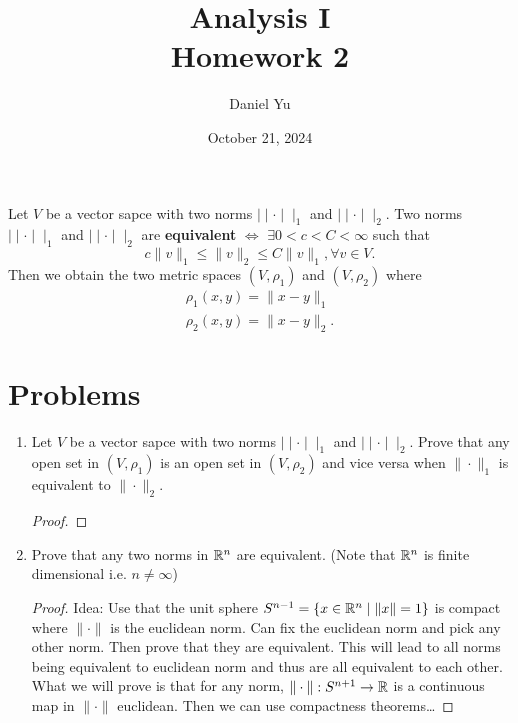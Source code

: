 \documentclass[a4paper]{article}
\title{\Huge{Analysis I}\\ Homework 2}
\author{\huge{Daniel Yu}}
\date{October 21, 2024}
\begin{document}
\maketitle
\newpage%
\pagebreak
\begin{definition}
  Let $V$ be a vector sapce with two norms  $\mid \mid \cdot \mid \mid_{1}$ and $\mid \mid \cdot \mid \mid_{2}$.  Two norms  $\mid \mid \cdot \mid \mid_{1}$ and $\mid \mid \cdot \mid \mid_{2}$ are \textbf{equivalent} $\iff$ $\exists 0 < c < C < \infty$ such that 
  \[
  c \|v\|_{1} \leq \|v\|_{2} \leq C \|v\|_{1}, \forall v \in V 
  .\]Then we obtain the two metric spaces $\left( V, \rho_1 \right) $ and $\left( V, \rho_{2} \right) $ where
  \begin{align*}
    \rho_{1} \left( x,y \right) = \|x-y\|_{1} \\
    \rho_{2} \left( x,y \right) = \|x-y\|_{2}
  .\end{align*}
\end{definition}
\section{Problems}
  \begin{enumerate}
    \item Let $V$ be a vector sapce with two norms  $\mid \mid \cdot \mid \mid_{1}$ and $\mid \mid \cdot \mid \mid_{2}$. Prove that any open set in $\left( V, \rho_{1} \right) $ is an open set in $(V,\rho_{2})$ and vice versa when $\|\cdot\|_{1}$ is equivalent to $\|\cdot\|_{2}$.
      \begin{proof}
        
      \end{proof}
    \item Prove that any two norms in $\mathbb{R}^{n}$ are equivalent. (Note that $\mathbb{R}^{n}$ is finite dimensional i.e. $n \neq \infty$)
       \begin{proof}
       Idea: Use that the unit sphere $S^{n-1} = \{x \in \mathbb{R}^{n} \mid \|x\| =1\}$ is compact where $\|\cdot\|$ is the euclidean norm. Can fix the euclidean norm and pick any other norm. Then prove that they are equivalent. This will lead to all norms being equivalent to euclidean norm and thus are all equivalent to each other. \\

       What we will prove is that for any norm, $\|\cdot\|: S^{n+1} \to \mathbb{R}$ is a continuous map in $\|\cdot\|$ euclidean. Then we can use compactness theorems\ldots
      \end{proof}
  \end{enumerate}
\end{document}
